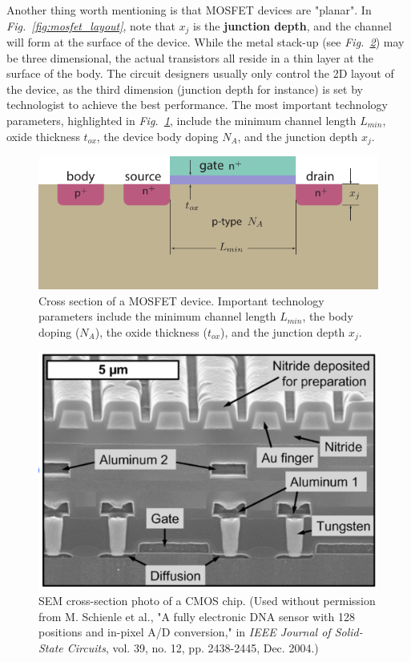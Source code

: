 Another thing worth mentioning is that MOSFET devices are "planar".  In \emph{Fig.~\ref{fig:mosfet_layout}}, note that $x_j$ is the \textbf{junction depth}, and the channel will form at the surface of the device.  While the metal stack-up (see \emph{Fig.~\ref{fig:cmos_photo}}) may be three dimensional, the actual transistors all reside in a thin layer at the surface of the body.  The circuit designers usually only control the 2D layout of the device, as the third dimension (junction depth for instance) is set by technologist to achieve the best performance.  The most important technology parameters, highlighted in \emph{Fig.~\ref{fig:mos_tech}}, include the minimum channel length $L_{min}$, oxide thickness $t_{ox}$, the device body doping $N_A$, and the junction depth $x_j$.
\newpage
\begin{figure}[t]
\centering
\includegraphics[width=\columnwidth]{mos_tech}
\caption{Cross section of a MOSFET device. Important technology parameters include the minimum channel length $L_{min}$, the body doping ($N_A$), the oxide thickness ($t_{ox}$), and the junction depth $x_j$.}
\label{fig:mos_tech}
\end{figure}
\begin{figure}[H]
\centering
\includegraphics[width=.85\columnwidth]{cmos_xsection_photo.png}
\caption{SEM cross-section photo of a CMOS chip. {\small(Used without permission from M. Schienle et al., "A fully electronic DNA sensor with 128 positions and in-pixel A/D conversion," in \emph{IEEE Journal of Solid-State Circuits}, vol. 39, no. 12, pp. 2438-2445, Dec. 2004.)}}
\label{fig:cmos_photo}
\end{figure}
